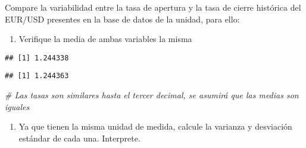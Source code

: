 \documentclass[
]{book}
\newenvironment{Shaded}{\begin{snugshade}}{\end{snugshade}}
\newcommand{\CommentTok}[1]{\textcolor[rgb]{0.56,0.35,0.01}{\textit{#1}}}
\newcommand{\FunctionTok}[1]{\textcolor[rgb]{0.00,0.00,0.00}{#1}}
\newcommand{\NormalTok}[1]{#1}
\newcommand{\SpecialCharTok}[1]{\textcolor[rgb]{0.00,0.00,0.00}{#1}}
\providecommand{\tightlist}{%
  \setlength{\itemsep}{0pt}\setlength{\parskip}{0pt}}
\begin{document}
Compare la variabilidad entre la tasa de apertura y la tasa de cierre histórica del EUR/USD presentes en la base de datos de la unidad, para ello:

\begin{enumerate}
\def\labelenumi{\arabic{enumi}.}
\tightlist
\item
  Verifique la media de ambas variables la misma
\end{enumerate}

\begin{Shaded}
\end{Shaded}

\begin{verbatim}
## [1] 1.244338
\end{verbatim}

\begin{Shaded}
\end{Shaded}

\begin{verbatim}
## [1] 1.244363
\end{verbatim}

\begin{Shaded}
\begin{Highlighting}[]
\CommentTok{\# Las tasas son similares hasta el tercer decimal, se asumirá que las medias son iguales}
\end{Highlighting}
\end{Shaded}

\begin{enumerate}
\def\labelenumi{\arabic{enumi}.}
\setcounter{enumi}{1}
\tightlist
\item
  Ya que tienen la misma unidad de medida, calcule la varianza y desviación estándar de cada una. Interprete.
\end{enumerate}

\begin{Shaded}
\end{Shaded}
\end{document}
